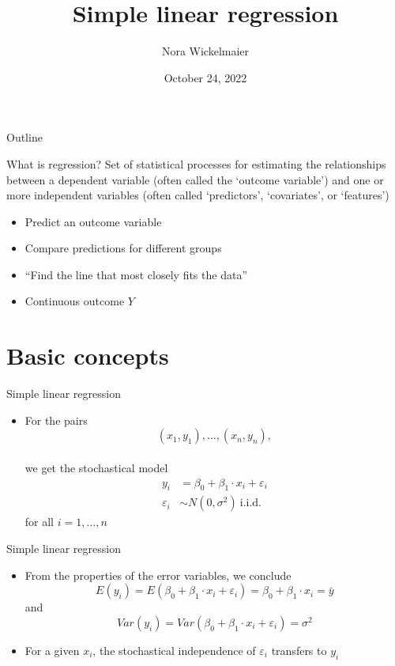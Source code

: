 \documentclass[aspectratio=169]{beamer}
\title{Simple linear regression}
\author{Nora Wickelmaier}
\date{October 24, 2022}
\begin{document}
\begin{frame}{}
\thispagestyle{empty}
\titlepage
\end{frame}

\begin{frame}{Outline}
\tableofcontents
\end{frame}


\begin{frame}{What is regression?}
  \pause
  Set of statistical processes for estimating the relationships between a
  dependent variable (often called the `outcome variable') and one or more
  independent variables (often called `predictors', `covariates', or
  `features')
  \pause
\vfill
  \begin{itemize}
    \item Predict an outcome variable
    \item Compare predictions for different groups
    \item ``Find the line that most closely fits the data''
    \item Continuous outcome $Y$
  \end{itemize}
\end{frame}

\section{Basic concepts}

\begin{frame}{Simple linear regression}
  \begin{itemize}
    \item For the pairs
      \[
        (x_1, y_1), \ldots, (x_n, y_n),
      \]\\[2ex]
    we get the stochastical model
      \begin{align*}
        y_i & = \beta_0 + \beta_1 \cdot x_i + \varepsilon_i\\
        \varepsilon_i & \sim N(0, \sigma^2)~\text{i.i.d.}
      \end{align*}
for all $i = 1, \dots, n$
  \end{itemize}
\end{frame}

\begin{frame}{Simple linear regression}
  \begin{itemize}
    \item From the properties of the error variables, we conclude
\[
  E(y_i) = E(\beta_0 + \beta_1 \cdot x_i + \varepsilon_i) =
  \beta_0 + \beta_1 \cdot x_i = \bar{y}
\]
and
\[
  Var(y_i) = Var(\beta_0 + \beta_1 \cdot x_i + \varepsilon_i) = \sigma^2
\]
\item For a given $x_i$, the stochastical independence of $\varepsilon_i$
  transfers to $y_i$\\[2ex]
  \end{itemize}
\end{frame}
\end{document}
